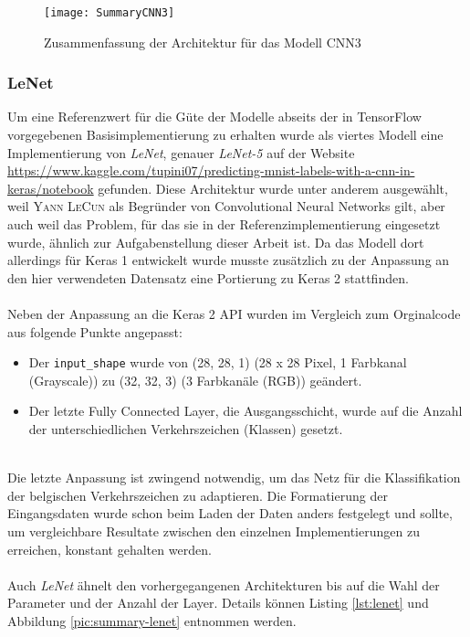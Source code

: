 \begin{figure} [H]
	\centering
	\texttt{[image: SummaryCNN3]}
	\caption{Zusammenfassung der Architektur für das Modell CNN3}
	\label{pic:summary-cnn3}
\end{figure}

\subsubsection{LeNet}
Um eine Referenzwert für die Güte der Modelle abseits der in TensorFlow vorgegebenen Basisimplementierung zu erhalten wurde als viertes Modell eine Implementierung von \textit{LeNet}, genauer \textit{LeNet-5} auf der Website \url{https://www.kaggle.com/tupini07/predicting-mnist-labels-with-a-cnn-in-keras/notebook} \cite{kaggle-lenet} gefunden. Diese Architektur wurde unter anderem ausgewählt, weil \textsc{Yann LeCun} als Begründer von Convolutional Neural Networks gilt, aber auch weil das Problem, für das sie in der Referenzimplementierung eingesetzt wurde, ähnlich zur Aufgabenstellung dieser Arbeit ist. Da das Modell dort allerdings für Keras 1 entwickelt wurde musste zusätzlich zu der Anpassung an den hier verwendeten Datensatz eine Portierung zu Keras 2 stattfinden. \\
\\
Neben der Anpassung an die Keras 2 API wurden im Vergleich zum Orginalcode aus \cite{kaggle-lenet} folgende Punkte angepasst:
\begin{itemize}
	\item Der \texttt{input\_shape} wurde von (28, 28, 1) (28 x 28 Pixel, 1 Farbkanal (Grayscale)) zu (32, 32, 3) (3 Farbkanäle (RGB)) geändert.
	\item Der letzte Fully Connected Layer, die Ausgangsschicht, wurde auf die Anzahl der unterschiedlichen Verkehrszeichen (Klassen) gesetzt.
\end{itemize} \ \\
Die letzte Anpassung ist zwingend notwendig, um das Netz für die Klassifikation der belgischen Verkehrszeichen zu adaptieren. Die Formatierung der Eingangsdaten wurde schon beim Laden der Daten anders festgelegt und sollte, um vergleichbare Resultate zwischen den einzelnen Implementierungen zu erreichen, konstant gehalten werden. \\
\\
Auch \textit{LeNet} ähnelt den vorhergegangenen Architekturen bis auf die Wahl der Parameter und der Anzahl der Layer. Details können Listing \ref{lst:lenet} und Abbildung \ref{pic:summary-lenet} entnommen werden.

